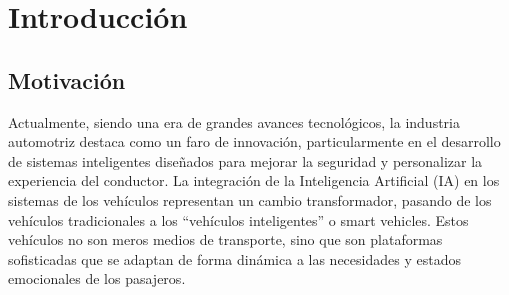 \documentclass[12pt]{report} %
\begin{document}

\chapter{Introducción}

\section{Motivación}

Actualmente, siendo una era de grandes avances tecnológicos, la industria automotriz destaca como un faro de innovación, particularmente en el desarrollo de sistemas inteligentes diseñados para mejorar la seguridad y personalizar la experiencia del conductor. La integración de la Inteligencia Artificial (IA) en los sistemas de los vehículos representan un cambio transformador, pasando de los vehículos tradicionales a los “vehículos inteligentes” o smart vehicles. Estos vehículos no son meros medios de transporte, sino que son plataformas sofisticadas que se adaptan de forma dinámica a las necesidades y estados emocionales de los pasajeros. 
\end{document}
